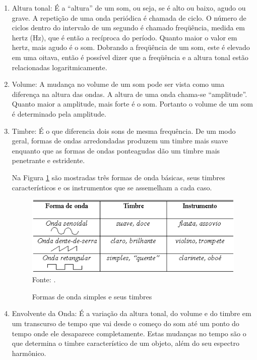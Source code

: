 \begin{enumerate}
\item Altura tonal: É a “altura” de um som, ou seja, se é alto ou baixo, agudo ou grave. A repetição de uma onda periódica é chamada de ciclo. O número de ciclos dentro do intervalo de um segundo é chamado freqüência, medida em hertz (Hz), que é então a recíproca do período. Quanto maior o valor em hertz, mais agudo é o som. Dobrando a freqüência de um som, este é elevado em uma oitava, então é possível dizer que a freqüência e a altura tonal estão relacionadas logaritmicamente.

\item Volume: A mudança no volume de um som pode ser vista como uma diferença na altura das ondas. A altura de uma onda chama-se “amplitude”. Quanto maior a amplitude, mais forte é o som. Portanto o volume de um som é determinado pela amplitude.

\item Timbre: É o que diferencia dois sons de mesma frequência. De um modo geral, formas de ondas arredondadas produzem um timbre mais suave enquanto que as formas de ondas ponteagudas dão um timbre mais penetrante e estridente.

Na Figura \ref{fig:ondaTimbre} são mostradas três formas de onda básicas, seus timbres característicos e os instrumentos que se assemelham a cada caso.

\begin{figure}[!htb]
   \centering
   \caption{Formas de onda simples e seus timbres}\label{fig:ondaTimbre} 
   \includegraphics[scale=0.4]{figuras/ondaTimbre.png}
   Fonte: \cite{miletto2004}.
\end{figure}

\item Envolvente da Onda: É a variação da altura tonal, do volume e do timbre em um transcurso de tempo que vai desde o começo do som até um ponto do tempo onde ele desaparece completamente. Estas mudanças no tempo são o que determina o timbre característico de um objeto, além do seu espectro harmônico.
\end{enumerate}

